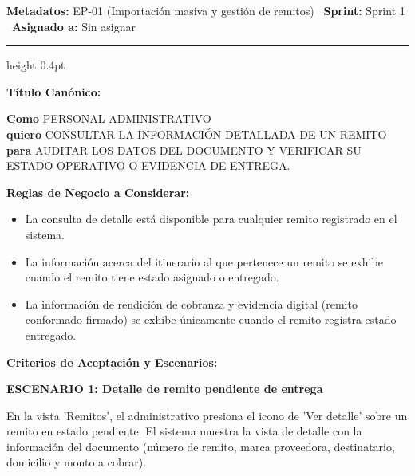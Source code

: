 \documentclass[a4paper,9pt]{article}
\begin{document}
\begin{tcolorbox}[hucard, title={\textbf{HU-39: CONSULTAR DETALLE DE UN REMITO} \hfill \scriptsize \colorbox{tealstatus}{\textbf{\ Accepted\ }} \quad \colorbox{white}{\textcolor{primarydark}{\textbf{\ 2 pts\ }}}}]
\vspace{-1pt}
\noindent\textbf{\footnotesize Metadatos:} EP-01 (Importación masiva y gestión de remitos) \textbar\ \textbf{Sprint:} Sprint 1 \textbar\ \textbf{Asignado a:} Sin asignar\par\vspace{2pt}
\hrule height 0.4pt\par\vspace{3pt}
\noindent\textbf{\footnotesize Título Canónico:}\par\vspace{1pt}
{\small \textbf{Como} PERSONAL ADMINISTRATIVO \\ \textbf{quiero} CONSULTAR LA INFORMACIÓN DETALLADA DE UN REMITO \\ \textbf{para} AUDITAR LOS DATOS DEL DOCUMENTO Y VERIFICAR SU ESTADO OPERATIVO O EVIDENCIA DE ENTREGA.}\par\vspace{3pt}
\noindent\textbf{\footnotesize Reglas de Negocio a Considerar:}\par\vspace{1pt}
{\footnotesize
\begin{itemize}[leftmargin=12pt, nosep, itemsep=1.5pt, topsep=1pt]
\item La consulta de detalle está disponible para cualquier remito registrado en el sistema.
\item La información acerca del itinerario al que pertenece un remito se exhibe cuando el remito tiene estado asignado o entregado.
\item La información de rendición de cobranza y evidencia digital (remito conformado firmado) se exhibe únicamente cuando el remito registra estado entregado.
\end{itemize}
}\par\vspace{3pt}
\noindent\textbf{\footnotesize Criterios de Aceptación y Escenarios:}\par\vspace{2pt}
{\footnotesize
\noindent\textbf{\textcolor{secondarydark}{ESCENARIO 1:  Detalle de remito pendiente de entrega}}\par\vspace{1pt}
En la vista 'Remitos', el administrativo presiona el icono de 'Ver detalle' sobre un remito en estado pendiente. El sistema muestra la vista de detalle con la información del documento (número de remito, marca proveedora, destinatario, domicilio y monto a cobrar).\par\vspace{2.5pt}
}
\end{tcolorbox}
\end{document}
